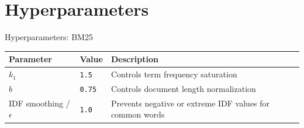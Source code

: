 \section{Hyperparameters}


\begin{frame}{Hyperparameters: BM25}
    \centering
    \renewcommand{\arraystretch}{1.5} %
    \begin{tabular}{l l p{6.5cm}} %
        \toprule
        \textbf{Parameter} & \textbf{Value} & \textbf{Description} \\
        \midrule
        $k_1$ & \texttt{1.5} & Controls term frequency saturation \\
        $b$ & \texttt{0.75} & Controls document length normalization \\
        IDF smoothing / $\epsilon$ & \texttt{1.0} & Prevents negative or extreme IDF  values \newline for common words \\
        \bottomrule
    \end{tabular}
\end{frame}


